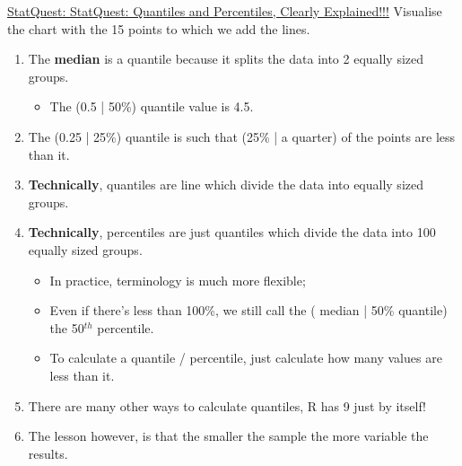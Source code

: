\documentclass[12pt, titlepage, french]{report}
\begin{document}
\begin{YTB_SUMM}{\href{https://www.youtube.com/watch?v=IFKQLDmRK0Y&feature=youtu.be}{StatQuest: StatQuest: Quantiles and Percentiles, Clearly Explained!!!}}
Visualise the chart with the 15 points to which we add the lines.
\begin{enumerate}
	\item	The \textbf{median} is a quantile because it splits the data into 2 equally sized groups.
	\begin{itemize}
		\item	The (0.5 | 50\%) quantile value is 4.5.
	\end{itemize}
	\item	The (0.25 | 25\%) quantile is such that (25\% | a quarter) of the points are less than it.
	\item	\textbf{Technically}, quantiles are line which divide the data into equally sized groups.
	\item	\textbf{Technically}, percentiles are just quantiles which divide the data into 100 equally sized groups.
	\begin{itemize}
		\item	In practice, terminology is much more flexible;
		\item	Even if there's less than 100\%, we still call the ( median | 50\% quantile) the 50$^{th}$ percentile.
		\item	To calculate a quantile / percentile, just calculate how many values are less than it.
	\end{itemize}
	\item	There are many other ways to calculate quantiles, R has 9 just by itself!
	\item	The lesson however, is that the smaller the sample the more variable the results.
\end{enumerate}
\end{YTB_SUMM}
\end{document}
